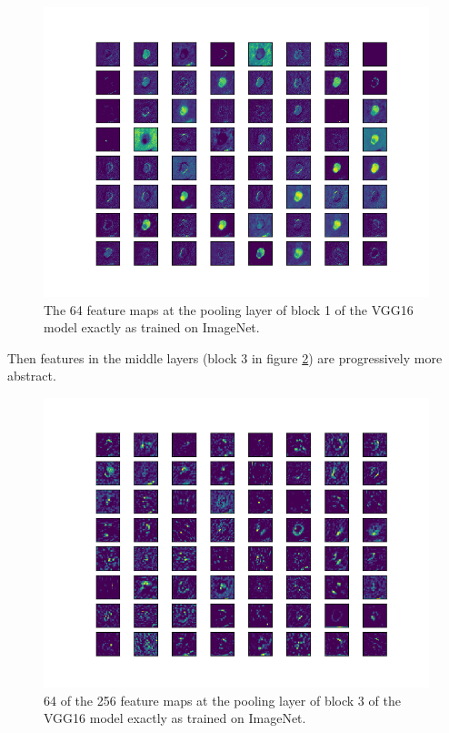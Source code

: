 \begin{figure}
    \centering
    \includegraphics[width=1.0\textwidth]{figs/vgg16_block1.png}
    \caption{The 64 feature maps at the pooling layer of block 1 of the VGG16 model exactly as trained on ImageNet.}
    \label{fig:vgg16_block1}
\end{figure}

Then features in the middle layers (block 3 in figure \ref{fig:vgg16_block3}) are progressively more abstract.

\begin{figure}
    \centering
    \includegraphics[width=1.0\textwidth]{figs/vgg16_block3.png}
    \caption{64 of the 256 feature maps at the pooling layer of block 3 of the VGG16 model exactly as trained on ImageNet.}
    \label{fig:vgg16_block3}
\end{figure}

